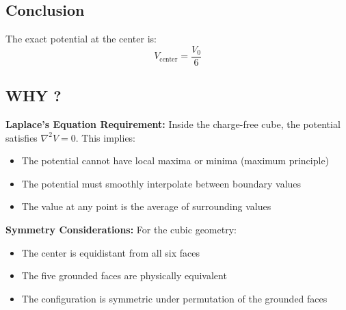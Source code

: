 \documentclass[a4paper]{article}
\begin{document}
\begin{tcolorbox}
\subsection{Conclusion}
The exact potential at the center is:
\[
\boxed{V_{\text{center}} = \frac{V_0}{6}}
\]

\subsection{WHY ?}
\textbf{Laplace's Equation Requirement:}  
Inside the charge-free cube, the potential satisfies $\nabla^2 V = 0$. This implies:
\begin{itemize}
\item The potential cannot have local maxima or minima (maximum principle)
\item The potential must smoothly interpolate between boundary values
\item The value at any point is the average of surrounding values
\end{itemize}

\textbf{Symmetry Considerations:}  
For the cubic geometry:
\begin{itemize}
\item The center is equidistant from all six faces
\item The five grounded faces are physically equivalent
\item The configuration is symmetric under permutation of the grounded faces
\end{itemize}
\end{tcolorbox}
\end{document}
